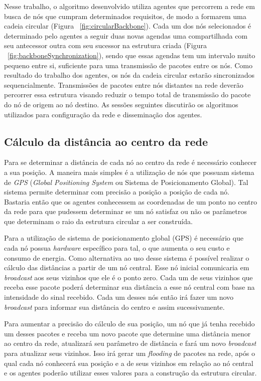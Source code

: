 Nesse trabalho, o algoritmo desenvolvido utiliza agentes que percorrem a rede em busca de nós que cumpram determinados requisitos, de modo a formarem uma cadeia circular (Figura ~\ref{fig:circularBackbone}). Cada um dos nós selecionados é determinado pelo agentes a seguir duas novas agendas uma compartilhada com seu antecessor outra com seu sucessor na estrutura criada (Figura ~\ref{fig:backboneSynchronization}), sendo que essas agendas tem um intervalo muito pequeno entre si, suficiente para uma transmissão de pacotes entre os nós. Como resultado do trabalho dos agentes, os nós da cadeia circular estarão sincronizados sequencialmente. Transmissões de pacotes entre nós distantes na rede deverão percorrer essa estrutura visando reduzir o tempo total de transmissão do pacote do nó de origem ao nó destino. As sessões seguintes discutirão os algoritmos utilizados para configuração da rede e disseminação dos agentes.

\subsection{Cálculo da distância ao centro da rede}
\label{sec:calculoDistancia}

Para se determinar a distância de cada nó ao centro da rede é necessário conhecer a sua posição. A maneira mais simples é a utilização de nós que possuam sistema de \emph{GPS} (\emph{Global Positioning System} ou Sistema de Posicionamento Global). Tal sistema permite determinar com precisão a posição a posição de cada nó. Bastaria então que os agentes conhecessem as coordenadas de um ponto no centro da rede para que pudessem determinar se um nó satisfaz ou não os parâmetros que determinam o raio da estrutura circular a ser construída.

Para a utilização de sistema de posicionamento global (GPS) é necessário que cada nó possua \emph{hardware} específico para tal, o que aumenta o seu custo e consumo de energia. Como alternativa ao uso desse sistema é possível realizar o cálculo das distâncias a partir de um nó central. Esse nó inicial comunicaria em \emph{broadcast} aos seus vizinhos que ele é o ponto zero. Cada um de seus vizinhos que receba esse pacote poderá determinar sua distância a esse nó central com base na intensidade do sinal recebido.  Cada um desses nós então irá fazer um novo \emph{broadcast} para informar sua distância do centro e assim sucessivamente. 

Para aumentar a precisão do cálculo de sua posição, um nó que já tenha recebido um desses pacotes e receba um novo pacote que determine uma distância menor ao centro da rede, atualizará seu parâmetro de distância e fará um novo \emph{broadcast} para atualizar seus vizinhos. Isso irá gerar um \emph{flooding} de pacotes na rede, após o qual cada nó conhecerá sua posição e a de seus vizinhos em relação ao nó central e os agentes poderão utilizar esses valores para a construção da estrutura circular. 

